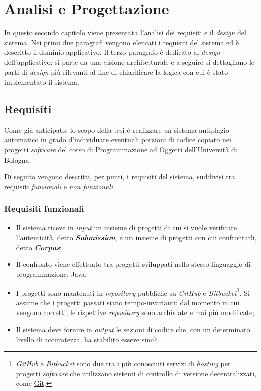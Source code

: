 \chapter{Analisi e Progettazione}
\label{chapter:analysis}
In questo secondo capitolo viene presentata l'analisi dei requisiti e il \textit{design} del sistema.
%
Nei primi due paragrafi vengono elencati i requisiti del sistema ed è descritto il dominio applicativo.
%
Il terzo paragrafo è dedicato al \textit{design} dell'applicativo: si parte da una visione architetturale e a seguire si dettagliano le parti di \textit{design} più rilevanti al fine di chiarificare la logica con cui è stato implementato il sistema.

\section{Requisiti}
Come già anticipato, lo scopo della tesi è realizzare un sistema antiplagio automatico in grado d'individuare eventuali porzioni di codice copiato nei progetti \textit{software} del corso di Programmazione ad Oggetti dell'Università di Bologna.

Di seguito vengono descritti, per punti, i requisiti del sistema, suddivisi tra requisiti \textit{funzionali} e \textit{non funzionali}.

\subsection*{Requisiti funzionali}
\begin{itemize}
    \item Il sistema riceve in \textit{input} un insieme di progetti di cui si vuole verificare l'autenticità, detto \textbf{\textit{Submission}}, e un insieme di progetti con cui confrontarli, detto \textbf{\textit{Corpus}};
    
    \item Il confronto viene effettuato tra progetti sviluppati nello stesso linguaggio di programmazione: Java.
    
    \item I progetti sono mantenuti in \textit{repository} pubbliche su \textit{GitHub} e \textit{Bitbucket}\footnote{
        \href{https://github.com}{\textit{GitHub}} e \href{https://bitbucket.org}{\textit{Bitbucket}} sono due tra i più conosciuti servizi di \textit{hosting} per progetti \textit{software} che utilizzano sistemi di controllo di versione decentralizzati, come \href{https://git-scm.com}{Git}.
    }. Si assume che i progetti passati siano tempo-invarianti: dal momento in cui vengono corretti, le rispettive \textit{repository} sono archiviate e mai più modificate;

    \item Il sistema deve fornire in \textit{output} le sezioni di codice che, con un determinato livello di accuratezza, ha stabilito essere simili.
\end{itemize}


